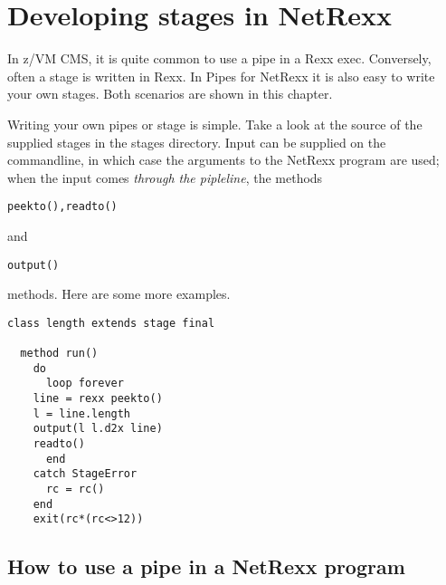 \chapter{Developing stages in NetRexx}

In z/VM CMS, it is quite common to use a pipe in a Rexx exec. Conversely,
often a stage is written in Rexx. In Pipes for
NetRexx it is also easy to write your own stages. Both scenarios are
shown in this chapter.

Writing your own pipes or stage is simple.  Take a look at the source
of the supplied stages in the stages directory.  Input can be supplied
on the commandline, in which case the arguments to the NetRexx program
are used; when the input comes \emph{through the pipleline}, the
methods \begin{alltt}peekto(), readto()\end{alltt}
and \begin{alltt}output()\end{alltt} methods. Here are some more
examples.
\begin{lstlisting}
class length extends stage final
 
  method run()
    do
      loop forever
    line = rexx peekto()
    l = line.length
    output(l l.d2x line)
    readto()
      end
    catch StageError
      rc = rc()
    end
    exit(rc*(rc<>12))
  \end{lstlisting}
  
\section{How to use a pipe in a NetRexx program}


